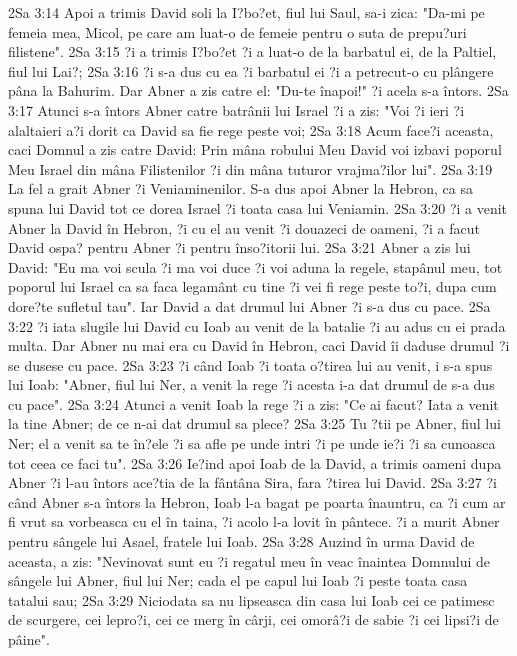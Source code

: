 2Sa 3:14  Apoi a trimis David soli la I?bo?et, fiul lui Saul, sa-i zica: "Da-mi pe femeia mea, Micol, pe care am luat-o de femeie pentru o suta de prepu?uri filistene".
2Sa 3:15  ?i a trimis I?bo?et ?i a luat-o de la barbatul ei, de la Paltiel, fiul lui Lai?;
2Sa 3:16  ?i s-a dus cu ea ?i barbatul ei ?i a petrecut-o cu plângere pâna la Bahurim. Dar Abner a zis catre el: "Du-te înapoi!" ?i acela s-a întors.
2Sa 3:17  Atunci s-a întors Abner catre batrânii lui Israel ?i a zis: "Voi ?i ieri ?i alaltaieri a?i dorit ca David sa fie rege peste voi;
2Sa 3:18  Acum face?i aceasta, caci Domnul a zis catre David: Prin mâna robului Meu David voi izbavi poporul Meu Israel din mâna Filistenilor ?i din mâna tuturor vrajma?ilor lui".
2Sa 3:19  La fel a grait Abner ?i Veniaminenilor. S-a dus apoi Abner la Hebron, ca sa spuna lui David tot ce dorea Israel ?i toata casa lui Veniamin.
2Sa 3:20  ?i a venit Abner la David în Hebron, ?i cu el au venit ?i douazeci de oameni, ?i a facut David ospa? pentru Abner ?i pentru înso?itorii lui.
2Sa 3:21  Abner a zis lui David: "Eu ma voi scula ?i ma voi duce ?i voi aduna la regele, stapânul meu, tot poporul lui Israel ca sa faca legamânt cu tine ?i vei fi rege peste to?i, dupa cum dore?te sufletul tau". Iar David a dat drumul lui Abner ?i s-a dus cu pace.
2Sa 3:22  ?i iata slugile lui David cu Ioab au venit de la batalie ?i au adus cu ei prada multa. Dar Abner nu mai era cu David în Hebron, caci David îi daduse drumul ?i se dusese cu pace.
2Sa 3:23  ?i când Ioab ?i toata o?tirea lui au venit, i s-a spus lui Ioab: "Abner, fiul lui Ner, a venit la rege ?i acesta i-a dat drumul de s-a dus cu pace".
2Sa 3:24  Atunci a venit Ioab la rege ?i a zis: "Ce ai facut? Iata a venit la tine Abner; de ce n-ai dat drumul sa plece?
2Sa 3:25  Tu ?tii pe Abner, fiul lui Ner; el a venit sa te în?ele ?i sa afle pe unde intri ?i pe unde ie?i ?i sa cunoasca tot ceea ce faci tu".
2Sa 3:26  Ie?ind apoi Ioab de la David, a trimis oameni dupa Abner ?i l-au întors ace?tia de la fântâna Sira, fara ?tirea lui David.
2Sa 3:27  ?i când Abner s-a întors la Hebron, Ioab l-a bagat pe poarta înauntru, ca ?i cum ar fi vrut sa vorbeasca cu el în taina, ?i acolo l-a lovit în pântece. ?i a murit Abner pentru sângele lui Asael, fratele lui Ioab.
2Sa 3:28  Auzind în urma David de aceasta, a zis: "Nevinovat sunt eu ?i regatul meu în veac înaintea Domnului de sângele lui Abner, fiul lui Ner; cada el pe capul lui Ioab ?i peste toata casa tatalui sau;
2Sa 3:29  Niciodata sa nu lipseasca din casa lui Ioab cei ce patimesc de scurgere, cei lepro?i, cei ce merg în cârji, cei omorâ?i de sabie ?i cei lipsi?i de pâine".
